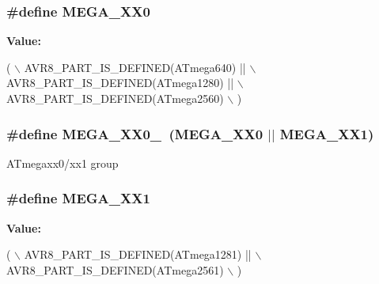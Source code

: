 \subsubsection[{M\+E\+G\+A\+\_\+\+X\+X0}]{\setlength{\rightskip}{0pt plus 5cm}\#define M\+E\+G\+A\+\_\+\+X\+X0}\label{group__mega__part__macros__group_gad59dc6f3c3dc91c94cd1673448135b83}
{\bfseries Value\+:}
\begin{DoxyCode}
( \(\backslash\)
        AVR8\_PART\_IS\_DEFINED(ATmega640)  || \(\backslash\)
        AVR8\_PART\_IS\_DEFINED(ATmega1280) || \(\backslash\)
        AVR8\_PART\_IS\_DEFINED(ATmega2560) \(\backslash\)
        )
\end{DoxyCode}
\hypertarget{group__mega__part__macros__group_ga59ba73abcf65d3d398e7d37d78c271fe}{}
\subsubsection[{M\+E\+G\+A\+\_\+\+X\+X0\+\_\+1}]{\setlength{\rightskip}{0pt plus 5cm}\#define M\+E\+G\+A\+\_\+\+X\+X0\+\_~(M\+E\+G\+A\+\_\+\+X\+X0 $\vert$$\vert$ M\+E\+G\+A\+\_\+\+X\+X1)}\label{group__mega__part__macros__group_ga59ba73abcf65d3d398e7d37d78c271fe}
A\+Tmegaxx0/xx1 group \hypertarget{group__mega__part__macros__group_ga9ed7e955cff24655d99517f91d9f6392}{}
\subsubsection[{M\+E\+G\+A\+\_\+\+X\+X1}]{\setlength{\rightskip}{0pt plus 5cm}\#define M\+E\+G\+A\+\_\+\+X\+X1}\label{group__mega__part__macros__group_ga9ed7e955cff24655d99517f91d9f6392}
{\bfseries Value\+:}
\begin{DoxyCode}
( \(\backslash\)
        AVR8\_PART\_IS\_DEFINED(ATmega1281) || \(\backslash\)
        AVR8\_PART\_IS\_DEFINED(ATmega2561) \(\backslash\)
        )
\end{DoxyCode}
\hypertarget{group__mega__part__macros__group_gadcf5297df4d3d2f2bb5ccd7d6e3578b6}{}
